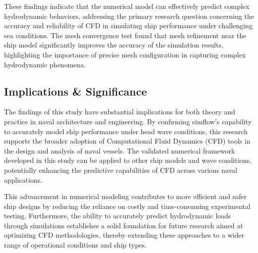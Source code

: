 \documentclass[12pt]{article} %
\begin{document}
These findings indicate that the numerical model can effectively predict complex hydrodynamic behaviors, addressing the primary research question 
concerning the accuracy and reliability of CFD in simulating ship performance under challenging sea conditions.
The mesh convergence test found that mesh refinement near the ship model significantly improves the accuracy of the simulation results, highlighting the importance of precise mesh configuration in capturing complex hydrodynamic phenomena.

\subsection{Implications \& Significance}
The findings of this study have substantial implications for both theory and practice in naval architecture and engineering. By confirming simflow's capability to accurately model ship performance under head wave conditions, this research supports the broader adoption of Computational Fluid Dynamics (CFD) tools in the design and analysis of naval vessels. The validated numerical framework developed in this study can be applied to other ship models and wave conditions, potentially enhancing the predictive capabilities of CFD across various naval applications.

This advancement in numerical modeling contributes to more efficient and safer ship designs by reducing the reliance on costly and time-consuming experimental testing. Furthermore, the ability to accurately predict hydrodynamic loads through simulations establishes a solid foundation for future research aimed at optimizing CFD methodologies, thereby extending these approaches to a wider range of operational conditions and ship types.
\end{document}
